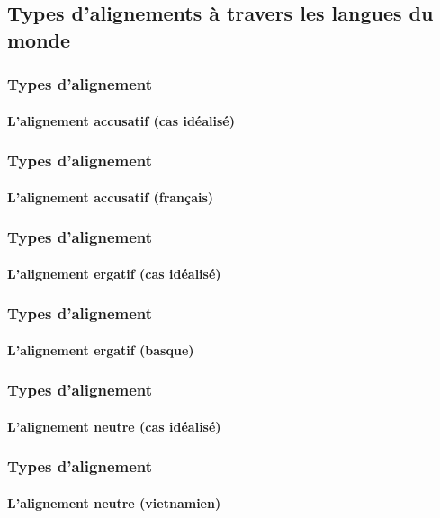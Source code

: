 \subsection[Alignements]{Types d'alignements à travers les langues du monde}




\begin{frame}
\frametitle{Types d'alignement}
\framesubtitle{L'alignement accusatif (cas idéalisé)}


\end{frame}


\begin{frame}
\frametitle{Types d'alignement}
\framesubtitle{L'alignement accusatif (français)}


\end{frame}


\begin{frame}
\frametitle{Types d'alignement}
\framesubtitle{L'alignement ergatif (cas idéalisé)}


\end{frame}


\begin{frame}
\frametitle{Types d'alignement}
\framesubtitle{L'alignement ergatif (basque)}


\end{frame}


\begin{frame}
\frametitle{Types d'alignement}
\framesubtitle{L'alignement neutre (cas idéalisé)}


\end{frame}



\begin{frame}
\frametitle{Types d'alignement}
\framesubtitle{L'alignement neutre (vietnamien)}


\end{frame}


